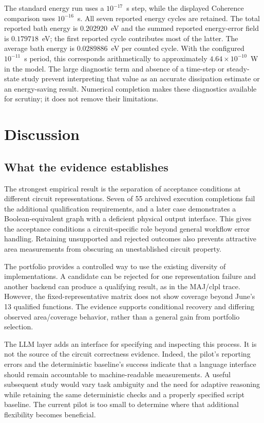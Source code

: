 \documentclass[ASNA,twocolumn]{USG}
\begin{document}
The standard energy run uses a $10^{-17}$~s step, while the displayed Coherence comparison uses $10^{-16}$~s. All seven reported energy cycles are retained. The total reported bath energy is $0.202920$~eV and the summed reported energy-error field is $0.179718$~eV; the first reported cycle contributes most of the latter. The average bath energy is $0.0289886$~eV per counted cycle. With the configured $10^{-11}$~s period, this corresponds arithmetically to approximately $4.64\times10^{-10}$~W in the model. The large diagnostic term and absence of a time-step or steady-state study prevent interpreting that value as an accurate dissipation estimate or an energy-saving result. Numerical completion makes these diagnostics available for scrutiny; it does not remove their limitations.

\section{Discussion}\label{sec:discussion}
\subsection{What the evidence establishes}
The strongest empirical result is the separation of acceptance conditions at different circuit representations. Seven of 55 archived execution completions fail the additional qualification requirements, and a later case demonstrates a Boolean-equivalent graph with a deficient physical output interface. This gives the acceptance conditions a circuit-specific role beyond general workflow error handling. Retaining unsupported and rejected outcomes also prevents attractive area measurements from obscuring an unestablished circuit property.

The portfolio provides a controlled way to use the existing diversity of implementations. A candidate can be rejected for one representation failure and another backend can produce a qualifying result, as in the MAJ/clpl trace. However, the fixed-representative matrix does not show coverage beyond June's 13 qualified functions. The evidence supports conditional recovery and differing observed area/coverage behavior, rather than a general gain from portfolio selection.

The LLM layer adds an interface for specifying and inspecting this process. It is not the source of the circuit correctness evidence. Indeed, the pilot's reporting errors and the deterministic baseline's success indicate that a language interface should remain accountable to machine-readable measurements. A useful subsequent study would vary task ambiguity and the need for adaptive reasoning while retaining the same deterministic checks and a properly specified script baseline. The current pilot is too small to determine where that additional flexibility becomes beneficial.
\end{document}
